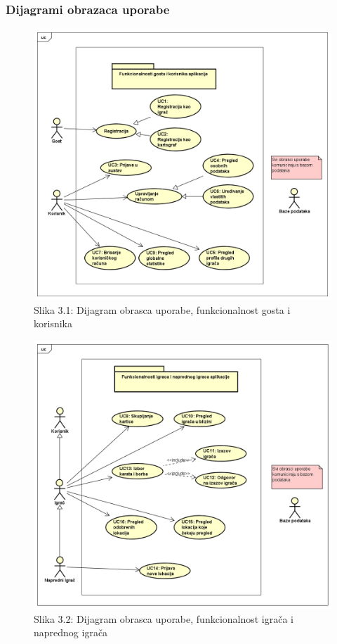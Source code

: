 					
				\subsubsection{Dijagrami obrazaca uporabe}
				
				\begin{figure}[H]
        			\includegraphics[scale=0.5]{slike/UCDiagrami/korisnik.png} %
        			\centering
        			\caption{Slika 3.1: Dijagram obrasca uporabe, funkcionalnost gosta i korisnika}
        			\label{fig:promjene}
        		\end{figure}
					
				\begin{figure}[H]
        			\includegraphics[scale=0.5]{slike/UCDiagrami/igrac.png} %
        			\centering
        			\caption{Slika 3.2: Dijagram obrasca uporabe, funkcionalnost igrača i naprednog igrača}
        			\label{fig:promjene}
        		\end{figure}
					

